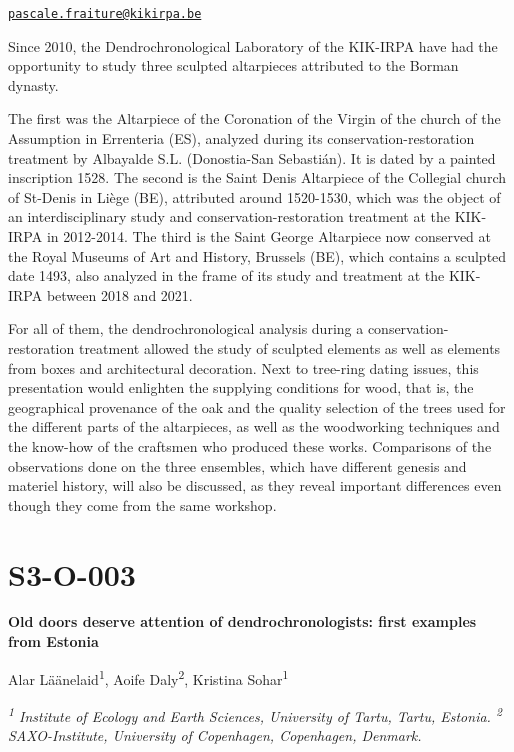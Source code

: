 \documentclass[
]{book}
\begin{document}
\href{mailto:pascale.fraiture@kikirpa.be}{\nolinkurl{pascale.fraiture@kikirpa.be}}

Since 2010, the Dendrochronological Laboratory of the KIK-IRPA have had the opportunity to study three sculpted altarpieces attributed to the Borman dynasty.

The first was the Altarpiece of the Coronation of the Virgin of the church of the Assumption in Errenteria (ES), analyzed during its conservation-restoration treatment by Albayalde S.L. (Donostia-San Sebastián). It is dated by a painted inscription 1528. The second is the Saint Denis Altarpiece of the Collegial church of St-Denis in Liège (BE), attributed around 1520-1530, which was the object of an interdisciplinary study and conservation-restoration treatment at the KIK-IRPA in 2012-2014. The third is the Saint George Altarpiece now conserved at the Royal Museums of Art and History, Brussels (BE), which contains a sculpted date 1493, also analyzed in the frame of its study and treatment at the KIK-IRPA between 2018 and 2021.

For all of them, the dendrochronological analysis during a conservation-restoration treatment allowed the study of sculpted elements as well as elements from boxes and architectural decoration. Next to tree-ring dating issues, this presentation would enlighten the supplying conditions for wood, that is, the geographical provenance of the oak and the quality selection of the trees used for the different parts of the altarpieces, as well as the woodworking techniques and the know-how of the craftsmen who produced these works. Comparisons of the observations done on the three ensembles, which have different genesis and materiel history, will also be discussed, as they reveal important differences even though they come from the same workshop.

\hypertarget{s3-o-003}{%
\section*{S3-O-003}\label{s3-o-003}}

\textbf{Old doors deserve attention of dendrochronologists: first examples from Estonia}

Alar Läänelaid\textsuperscript{1}, Aoife Daly\textsuperscript{2}, Kristina Sohar\textsuperscript{1}

\emph{\textsuperscript{1} Institute of Ecology and Earth Sciences, University of Tartu, Tartu, Estonia. \textsuperscript{2} SAXO-Institute, University of Copenhagen, Copenhagen, Denmark.}
\end{document}
